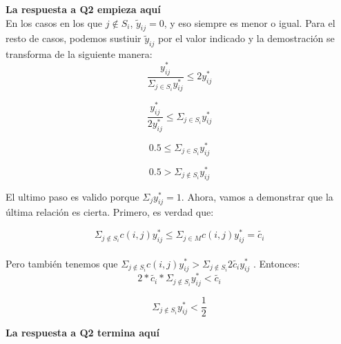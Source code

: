 \textbf{La respuesta a Q2 empieza aquí} 
\\
En los casos en los que $j \notin S_i$, $\tilde{y}_{ij} = 0$, y eso siempre es menor o igual.
Para el resto de casos, podemos sustiuir $\tilde{y}_{ij}$ por el valor indicado y la demostración se transforma de la siguiente manera:
\begin{equation}
 \frac{y^*_{ij}}{\Sigma_{j \in S_i} y^*_{ij}} \leq 2y^*_{ij}
\end{equation}

\begin{equation}
 \frac{y^*_{ij}}{2y^*_{ij}} \leq \Sigma_{j \in S_i} y^*_{ij}
\end{equation}

\begin{equation}
 0.5 \leq \Sigma_{j \in S_i} y^*_{ij}
\end{equation}

\begin{equation}
 0.5 > \Sigma_{j \notin S_i} y^*_{ij}
\end{equation}

El ultimo paso es valido porque $\Sigma_{j} y^*_{ij} = 1$. Ahora, vamos a demonstrar que la última relación es cierta. Primero, es verdad que:

\begin{equation}
 \Sigma_{j \notin S_i} c(i,j) y^*_{ij} \leq \Sigma_{j \in M} c(i,j) y^*_{ij} = \tilde{c_i}
\end{equation}
\\
Pero también tenemos que $\Sigma_{j \notin S_i} c(i,j) y^*_{ij} > \Sigma_{j \notin S_i} 2 \tilde{c_i} y^*_{ij}$ . Entonces:
\\
\begin{equation}
 2* \tilde{c_i} * \Sigma_{j \notin S_i} y^*_{ij}  < \tilde{c_i}
\end{equation}

\begin{equation}
 \Sigma_{j \notin S_i} y^*_{ij} < \frac{1}{2}
\end{equation}


\textbf{La respuesta a Q2 termina aquí}
